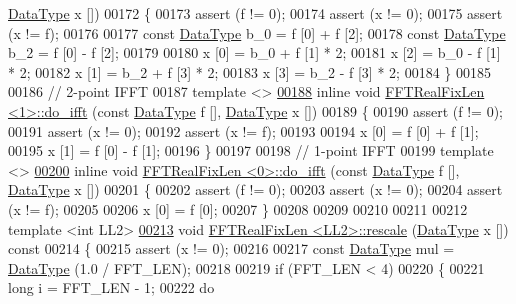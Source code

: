 \begin{DoxyCode}
      \hyperlink{a00011_a1aee47aa93a19226faec1c1bf91a6bd4}{DataType} x [])
00172 \{
00173     assert (f != 0);
00174     assert (x != 0);
00175     assert (x != f);
00176 
00177     \textcolor{keyword}{const} \hyperlink{a00011_a1aee47aa93a19226faec1c1bf91a6bd4}{DataType}  b\_0 = f [0] + f [2];
00178     \textcolor{keyword}{const} \hyperlink{a00011_a1aee47aa93a19226faec1c1bf91a6bd4}{DataType}  b\_2 = f [0] - f [2];
00179 
00180     x [0] = b\_0 + f [1] * 2;
00181     x [2] = b\_0 - f [1] * 2;
00182     x [1] = b\_2 + f [3] * 2;
00183     x [3] = b\_2 - f [3] * 2;
00184 \}
00185 
00186 \textcolor{comment}{// 2-point IFFT}
00187 \textcolor{keyword}{template} <>
\hypertarget{a00098_source_l00188}{}\hyperlink{a00011_a66a7bc1e12f6301effb5c08e91ded8ec}{00188} \textcolor{keyword}{inline} \textcolor{keywordtype}{void} \hyperlink{a00011}{FFTRealFixLen <1>::do\_ifft} (\textcolor{keyword}{const} \hyperlink{a00011_a1aee47aa93a19226faec1c1bf91a6bd4}{DataType} f [], 
      \hyperlink{a00011_a1aee47aa93a19226faec1c1bf91a6bd4}{DataType} x [])
00189 \{
00190     assert (f != 0);
00191     assert (x != 0);
00192     assert (x != f);
00193 
00194     x [0] = f [0] + f [1];
00195     x [1] = f [0] - f [1];
00196 \}
00197 
00198 \textcolor{comment}{// 1-point IFFT}
00199 \textcolor{keyword}{template} <>
\hypertarget{a00098_source_l00200}{}\hyperlink{a00011_ad0a8e8d871a7ee9b7a254e925b21c943}{00200} \textcolor{keyword}{inline} \textcolor{keywordtype}{void} \hyperlink{a00011}{FFTRealFixLen <0>::do\_ifft} (\textcolor{keyword}{const} \hyperlink{a00011_a1aee47aa93a19226faec1c1bf91a6bd4}{DataType} f [], 
      \hyperlink{a00011_a1aee47aa93a19226faec1c1bf91a6bd4}{DataType} x [])
00201 \{
00202     assert (f != 0);
00203     assert (x != 0);
00204     assert (x != f);
00205 
00206     x [0] = f [0];
00207 \}
00208 
00209 
00210 
00211 
00212 \textcolor{keyword}{template} <\textcolor{keywordtype}{int} LL2>
\hypertarget{a00098_source_l00213}{}\hyperlink{a00011_aa37f8f1a55863abc72e4de647ce427fb}{00213} \textcolor{keywordtype}{void}    \hyperlink{a00011}{FFTRealFixLen <LL2>::rescale} (\hyperlink{a00011_a1aee47aa93a19226faec1c1bf91a6bd4}{DataType} x []) \textcolor{keyword}{const}
00214 \{
00215     assert (x != 0);
00216 
00217     \textcolor{keyword}{const} \hyperlink{a00011_a1aee47aa93a19226faec1c1bf91a6bd4}{DataType}  mul = \hyperlink{a00011_a1aee47aa93a19226faec1c1bf91a6bd4}{DataType} (1.0 / FFT\_LEN);
00218 
00219     \textcolor{keywordflow}{if} (FFT\_LEN < 4)
00220     \{
00221         \textcolor{keywordtype}{long}                i = FFT\_LEN - 1;
00222         \textcolor{keywordflow}{do}

\end{DoxyCode}
